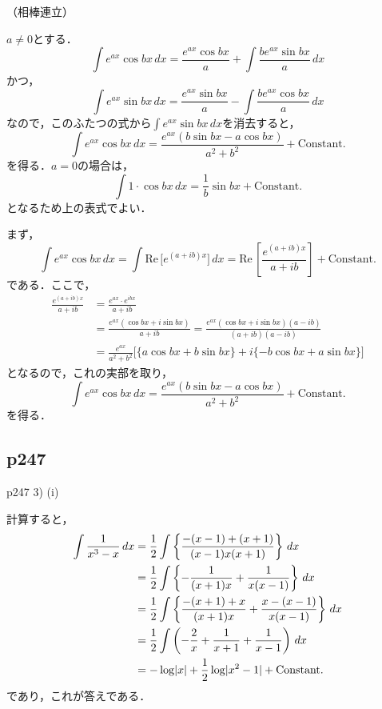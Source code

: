 \documentclass[dvipdfmx,uplatex,11pt]{jsarticle}
\DeclarePairedDelimiter\abs{\lvert}{\rvert}
\theoremstyle{definition}
\begin{document}
\newpage
（相棒連立）
\begin{leftbar}
    $a \ne 0$とする．
    \[ 
        \int e^{ax} \cos bx \, dx   = \frac{e^{ax} \cos bx}{a} + \int \frac{b e^{ax} \sin bx}{a} \, dx 
    \]
    かつ，
    \[
        \int e^{ax} \sin bx \, dx  = \frac{e^{ax} \sin bx}{a}- \int \frac{b e^{ax} \cos bx}{a} \, dx 
    \]
    なので，このふたつの式から$\int e^{ax} \sin bx \, dx$を消去すると，
    \[
        \int e^{ax} \cos bx \, dx  = \frac{e^{ax}(b \sin bx- a \cos bx)}{a^2+b^2} + \mathrm{Constant.}
    \]
    を得る．$a =0$の場合は，
    \[
        \int 1 \cdot \cos bx \, dx = \frac{1}{b} \sin bx + \mathrm{Constant.}
    \]
    となるため上の表式でよい．
\end{leftbar}

\begin{leftbar}
    まず，
    \[
        \int e^{ax} \cos bx \, dx = \int \mathrm{Re} \, \bigl [e^{(a+ib)x} \bigl ] \, dx = \mathrm{Re} \, \left [\frac{e^{(a+ib)x}}{a+ib} \right] + \mathrm{Constant.}
    \]
    である．ここで，
    \begin{align*}
        \frac{e^{(a+ib)x}}{a+ib} & = \frac{e^{ax} \cdot e^{ibx}}{a+ib} \\
        & = \frac{e^{ax}(\cos bx + i \sin bx)}{a+ib}=  \frac{e^{ax}(\cos bx + i \sin bx)(a-ib)}{(a+ib)(a-ib)} \\
        & = \frac{e^{ax}}{a^2+b^2} \bigl[ \{a \cos bx + b \sin bx \}+i\{ -b \cos bx + a \sin bx\} \bigl]
    \end{align*}
    となるので，これの実部を取り，
    \[
        \int e^{ax} \cos bx \, dx  = \frac{e^{ax}(b \sin bx- a \cos bx)}{a^2+b^2} + \mathrm{Constant.}
    \]
    を得る．
\end{leftbar}

\newpage

\subsection{p247}

p247 3) (i)
\begin{leftbar}
    計算すると，
    \begin{align*}
        \int \frac{1}{x^3-x} \, dx & = \frac{1}{2} \int \left \{ \frac{-(x-1)+(x+1)}{(x-1)x(x+1)} \right \} \, dx \\
        & = \frac{1}{2} \int \left \{ -\frac{1}{(x+1)x}+\frac{1}{x(x-1)} \right \} \, dx \\
        & = \frac{1}{2} \int \left \{ \frac{-(x+1)+x}{(x+1)x} + \frac{x-(x-1)}{x(x-1)} \right \} \, dx \\
        & = \frac{1}{2} \int \left ( -\frac{2}{x}+\frac{1}{x+1}+\frac{1}{x-1} \right) \, dx \\
        & = -\log \abs{x} + \frac{1}{2} \log \abs{x^2-1}+ \mathrm{Constant.}
    \end{align*}
    であり，これが答えである．
\end{leftbar}
\end{document}
